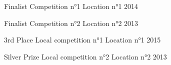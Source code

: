 




\begin{cvhonors}


\cvhonor
{Finalist} %
{Competition n°1} %
{Location n°1} %
{2014} %


\cvhonor
{Finalist} %
{Competition n°2} %
{Location n°2} %
{2013} %

\end{cvhonors}




\begin{cvhonors}


\cvhonor
{3rd Place} %
{Local competition n°1} %
{Location n°1} %
{2015} %


\cvhonor
{Silver Prize} %
{Local competition n°2} %
{Location n°2} %
{2013} %

\end{cvhonors}